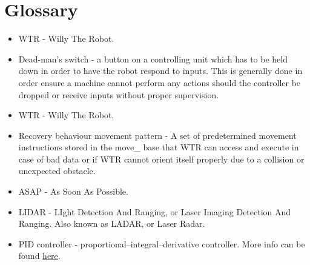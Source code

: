 \section{Glossary}
\begin{itemize}
\item \label{trm::WTR} WTR - Willy The Robot.
\item \label{trm::dms} Dead-man's switch - a button on a controlling unit which has to be held down in order to have the robot respond to inputs. This is generally done in order ensure a machine cannot perform any actions should the controller be dropped or receive inputs without proper supervision.
\item WTR - Willy The Robot.
\item \label{trm::recpat}Recovery behaviour movement pattern - A set of predetermined movement instructions stored in the move\_ base that WTR can access and execute in case of bad data or if WTR cannot orient itself properly due to a collision or unexpected obstacle.
\item \label{trm::ASAP} ASAP - As Soon As Possible.
\item \label{trm::LIDAR} LIDAR - LIght Detection And Ranging, or Laser Imaging Detection And Ranging. Also known as LADAR, or Laser Radar.
\item \label{trm::PIcontroller} PID controller - proportional–integral–derivative controller. More info can be found \href{https://en.wikipedia.org/wiki/PID_controller}{here}.
\end{itemize}